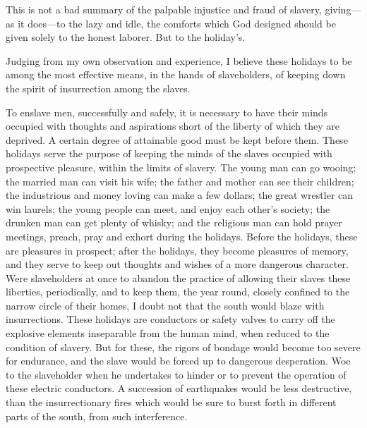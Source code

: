 This is not a bad summary of the palpable injustice and fraud of
slavery, giving---as it does---to the lazy and idle, the comforts which
God designed should be given solely to the honest laborer. But to the
holiday's.

Judging from my own observation and experience, I believe these holidays
to be among the most effective means, in the hands of slaveholders, of
keeping down the spirit of insurrection among the slaves.

To enslave men, successfully and safely, it is necessary to have their
minds occupied with thoughts and aspirations short of the liberty of
which they are deprived. A certain degree of attainable good must be
kept before them. These holidays serve the purpose of keeping the minds
of the slaves occupied with prospective pleasure, within the limits of
slavery. The young man can go wooing; the married man can visit his
wife; the father and mother can see their children; the industrious and
money loving can make a few dollars; the great wrestler can win laurels;
the young people can meet, and enjoy each other's society; the drunken
man can get plenty of whisky; {}and the religious man can hold prayer
meetings, preach, pray and exhort during the holidays. Before the
holidays, these are pleasures in prospect; after the holidays, they
become pleasures of memory, and they serve to keep out thoughts and
wishes of a more dangerous character. Were slaveholders at once to
abandon the practice of allowing their slaves these liberties,
periodically, and to keep them, the year round, closely confined to the
narrow circle of their homes, I doubt not that the south would blaze
with insurrections. These holidays are conductors or safety valves to
carry off the explosive elements inseparable from the human mind, when
reduced to the condition of slavery. But for these, the rigors of
bondage would become too severe for endurance, and the slave would be
forced up to dangerous desperation. Woe to the slaveholder when he
undertakes to hinder or to prevent the operation of these electric
conductors. A succession of earthquakes would be less destructive, than
the insurrectionary fires which would be sure to burst forth in
different parts of the south, from such interference.

